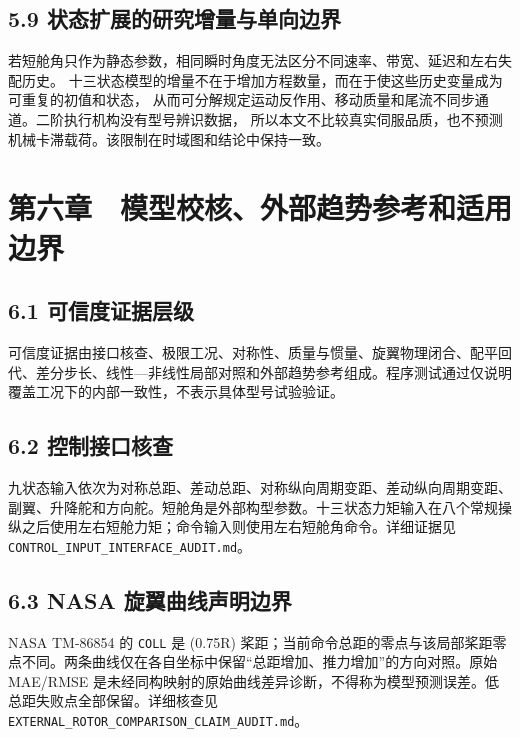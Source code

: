 \documentclass[UTF8,11pt,oneside,openany,fontset=windows]{ctexbook}
\begin{document}
\section{5.9
状态扩展的研究增量与单向边界}\label{ux72b6ux6001ux6269ux5c55ux7684ux7814ux7a76ux589eux91cfux4e0eux5355ux5411ux8fb9ux754c}

若短舱角只作为静态参数，相同瞬时角度无法区分不同速率、带宽、延迟和左右失配历史。
十三状态模型的增量不在于增加方程数量，而在于使这些历史变量成为可重复的初值和状态，
从而可分解规定运动反作用、移动质量和尾流不同步通道。二阶执行机构没有型号辨识数据，
所以本文不比较真实伺服品质，也不预测机械卡滞载荷。该限制在时域图和结论中保持一致。

\chapter{第六章　模型校核、外部趋势参考和适用边界}\label{ux7b2cux516dux7ae0-ux6a21ux578bux6821ux6838ux5916ux90e8ux8d8bux52bfux53c2ux8003ux548cux9002ux7528ux8fb9ux754c}

\section{6.1
可信度证据层级}\label{ux53efux4fe1ux5ea6ux8bc1ux636eux5c42ux7ea7}

可信度证据由接口核查、极限工况、对称性、质量与惯量、旋翼物理闭合、配平回代、差分步长、线性---非线性局部对照和外部趋势参考组成。程序测试通过仅说明覆盖工况下的内部一致性，不表示具体型号试验验证。

\section{6.2 控制接口核查}\label{ux63a7ux5236ux63a5ux53e3ux6838ux67e5}

九状态输入依次为对称总距、差动总距、对称纵向周期变距、差动纵向周期变距、副翼、升降舵和方向舵。短舱角是外部构型参数。十三状态力矩输入在八个常规操纵之后使用左右短舱力矩；命令输入则使用左右短舱角命令。详细证据见
\texttt{CONTROL\_INPUT\_INTERFACE\_AUDIT.md}。

\section{6.3 NASA
旋翼曲线声明边界}\label{nasa-ux65cbux7ffcux66f2ux7ebfux58f0ux660eux8fb9ux754c}

NASA TM-86854 的 \texttt{COLL} 是 (0.75R)
桨距；当前命令总距的零点与该局部桨距零点不同。两条曲线仅在各自坐标中保留``总距增加、推力增加''的方向对照。原始
MAE/RMSE
是未经同构映射的原始曲线差异诊断，不得称为模型预测误差。低总距失败点全部保留。详细核查见
\texttt{EXTERNAL\_ROTOR\_COMPARISON\_CLAIM\_AUDIT.md}。
\end{document}
